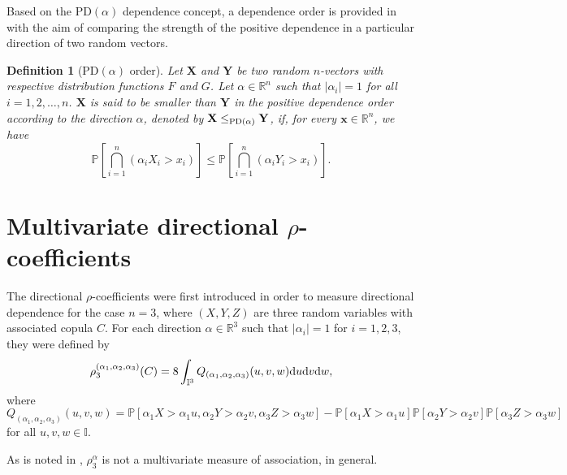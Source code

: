 \documentclass[11pt,a4paper]{article}
\newcommand{\I}{\mbox{${\rm I\!I}$}}
\newtheorem{definition}{Definition}
\newtheorem{example}{Example}
\def\XX{{\mathbf X}}
\def\YY{{\mathbf Y}}
\def\xx{{\mathbf x}}
\def\I{{\mathbb I}}
\begin{document}
Based on the PD$(\alpha)$ dependence concept, a dependence order is provided  in \cite{Edeamo2024} with the aim of comparing the strength of the positive dependence in a particular direction of two random vectors.

\begin{definition}[PD$(\alpha)$ order]\label{def:PDorder}
Let $\XX$ and $\YY$ be two random $n$-vectors with respective distribution functions $F$ and $G$. Let $\alpha\in\mathbb{R}^n$ such that $|\alpha_i|=1$ for all $i=1,2,\ldots,n$. $\XX$ is said to be {\it smaller than} $\YY$ {\it in the positive dependence order according to the direction} $\alpha$, denoted by $\XX\leq_{{\rm PD}(\alpha)}\YY$, if, for every $\xx\in\mathbb{R}^n$, we have 
$$\mathbb{P}\left[\bigcap_{i=1}^n(\alpha_iX_i>x_i)\right]\leq\mathbb{P}\left[\bigcap_{i=1}^n(\alpha_iY_i>x_i)\right].$$
\end{definition}


\section{Multivariate directional $\rho$-coefficients}\label{sec:main}

The directional $\rho$-coefficients were first introduced in \cite{Ne2011} order to measure directional dependence for the case $n=3$, where $(X,Y,Z)$ are three random variables with associated copula $C$. For each direction $\alpha\in\mathbb{R}^3$ such that $|\alpha_i|=1$ for $i=1,2,3$, they were defined by
$$\rho_3^{(\alpha_1,\alpha_2,\alpha_3)}(C)=8\int_{\I^3}Q_{(\alpha_1,\alpha_2,\alpha_3)}(u,v,w){\rm d}u{\rm d}v{\rm d}w,$$
where $$Q_{(\alpha_1,\alpha_2,\alpha_3)}(u,v,w)=\mathbb{P}[\alpha_1X>\alpha_1u, \alpha_2Y>\alpha_2v,\alpha_3Z>\alpha_3w]-\mathbb{P}[\alpha_1X>\alpha_1u]\mathbb{P}[\alpha_2Y>\alpha_2v]\mathbb{P}[\alpha_3Z>\alpha_3w]$$ for all $u,v,w\in \I$.

As is noted in \cite[Remark 3]{Ne2011}, $\rho_3^{\alpha}$ is not a multivariate measure of association, in general.


\end{document}
